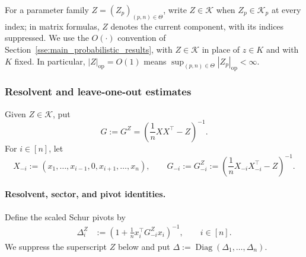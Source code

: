 \documentclass[EJP, preprint, NODS, nobera, nofontexpansion]{ejpecp}
\DeclareMathOperator{\op}{op}
\DeclareMathOperator{\diag}{Diag}
\begin{document}

For a parameter family $Z=(Z_p)_{(p,n)\in\Theta}$, write
$Z\in\mathcal K$ when $Z_p\in\mathcal K_p$ at every index; in matrix
formulas, $Z$ denotes the current component, with its indices suppressed.
We use the $O(\cdot)$ convention of
Section~\ref{sse:main_probabilistic_results}, with
$Z\in\mathcal K$ in place of $z\in K$ and with $K$ fixed.
In particular, $|Z|_{\op}=O(1)$ means $\sup_{(p,n)\in\Theta}|Z_p|_{\op}<\infty$.


\subsubsection{Resolvent and leave-one-out estimates}
\label{sse:universal_probabilistic_toolbox}

Given $Z\in\mathcal K$, put
\[
    G:=G^Z=\left(\frac1n XX^\top-Z\right)^{-1}.
\]
For $i\in[n]$, let
\[
    X_{-i}:=(x_1,\ldots,x_{i-1},0,x_{i+1},\ldots,x_n),
    \qquad
    G_{-i}:=G_{-i}^Z:=
    \left(\frac1nX_{-i}X_{-i}^{\top}-Z\right)^{-1}.
\]



\paragraph{Resolvent, sector, and pivot identities.}

Define the scaled Schur pivots by
\begin{align}\label{eq:def_matrix_schur_pivot}
    \Delta_i^Z
    &:=
    \left(
        1+\frac1n x_i^{\top}G_{-i}^Zx_i
    \right)^{-1},
    \qquad i\in[n].
\end{align}
We suppress the superscript $Z$ below and put
$\Delta:=\diag(\Delta_1,\ldots,\Delta_n)$.
\end{document}
